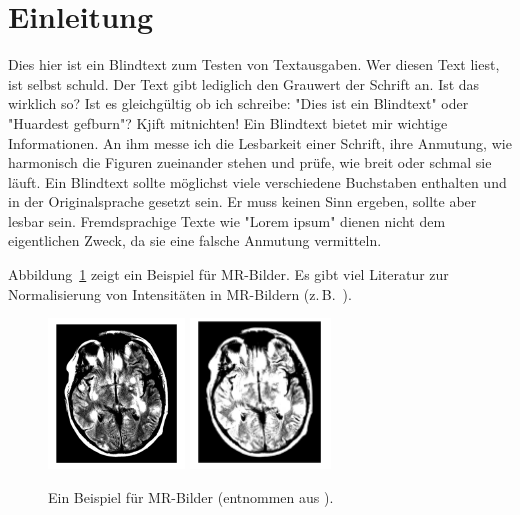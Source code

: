 
\section{Einleitung}%
\label{sec:einleitung}

Dies hier ist ein Blindtext zum Testen von Textausgaben.
Wer diesen Text liest, ist selbst schuld.
Der Text gibt lediglich den Grauwert der Schrift an.
Ist das wirklich so?
Ist es gleichgültig ob ich schreibe:
"Dies ist ein Blindtext" oder "Huardest gefburn"? Kjift mitnichten!
Ein Blindtext bietet mir wichtige Informationen. 
An ihm messe ich die Lesbarkeit einer Schrift, ihre Anmutung,
wie harmonisch die Figuren zueinander stehen und prüfe, wie breit oder schmal sie läuft. 
Ein Blindtext sollte möglichst viele verschiedene Buchstaben enthalten
und in der Originalsprache gesetzt sein. Er muss keinen Sinn ergeben, sollte
aber lesbar sein. Fremdsprachige Texte wie "Lorem ipsum" dienen nicht dem
eigentlichen Zweck, da sie eine falsche Anmutung vermitteln.


Abbildung~\ref{fig:mri} zeigt ein Beispiel für MR-Bilder.
Es gibt viel Literatur zur Normalisierung von Intensitäten in MR-Bildern (z.\,B.~\cite{Jaeger09}). 


\begin{figure}[h]
\centering
\includegraphics[height=4cm]{Grafiken/jaeger1.png}
\includegraphics[height=4cm]{Grafiken/jaeger2.png}
\caption{Ein Beispiel für MR-Bilder (entnommen aus \cite{Jaeger09}).}%
\label{fig:mri}
\end{figure}
